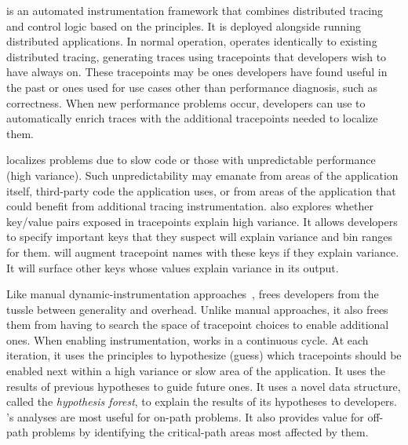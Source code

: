 \STAIF{} is an automated instrumentation framework that combines
distributed tracing and control logic based on the principles.  It is
deployed alongside running distributed applications.  In normal
operation, \STAIF{} operates identically to existing distributed
tracing, generating traces using tracepoints that developers wish to
have always on.  These tracepoints may be ones developers have found
useful in the past or ones used for use cases other than performance
diagnosis, such as correctness.  When new performance problems occur,
developers can use \STAIF{} to automatically enrich traces with the
additional tracepoints needed to localize them.

\STAIF{} localizes problems due to slow code or those with
unpredictable performance (high variance).  Such unpredictability may
emanate from areas of the application itself, third-party code the
application uses, or from areas of the application that could benefit
from additional tracing instrumentation. \STAIF{}
also explores whether key/value pairs exposed in tracepoints explain
high variance.  It allows developers to specify important keys that
they suspect will explain variance and bin ranges for them.  \STAIF{}
will augment tracepoint names with these keys if they explain
variance.  It will surface other keys whose values explain variance in
its output.

Like manual dynamic-instrumentation
approaches~\cite{Erlingsson:2011wy, Mace:2015uh}, \STAIF{} frees
developers from the tussle between generality and overhead.  Unlike
manual approaches, it also frees them from having to search the space
of tracepoint choices to enable additional ones.  When enabling
instrumentation, \STAIF{} works in a continuous cycle.  At each
iteration, it uses the principles to hypothesize (guess) which
tracepoints should be enabled next within a high variance or slow area
of the application.  It uses the results of previous hypotheses to
guide future ones.  It uses a novel data structure, called
the \textit{hypothesis forest}, to explain the results of its
hypotheses to developers.  \STAIF{}'s analyses are most useful for
on-path problems.  It also provides value for off-path problems by
identifying the critical-path areas most affected by them.

%

